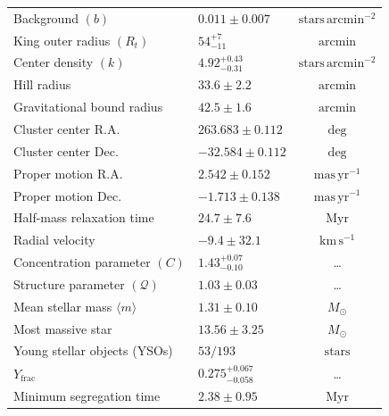 \documentclass{aa}
\begin{document}
\begin{table}[!tbp]
{\begin{tabular}{llc}
			Background $(b)$                        & $0.011 \pm 0.007$  & $\mathrm{stars\,arcmin^{-2}}$      \\
			King outer radius $(R_t)$               & $54^{+7}_{-11}$ & $\mathrm{arcmin}$                  \\
			Center density $(k)$                    & $4.92^{+0.43}_{-0.31}$   & $\mathrm{stars\,arcmin^{-2}}$      \\
			Hill radius                             & $33.6 \pm 2.2$            & $\mathrm{arcmin}$                  \\
			Gravitational bound radius              & $42.5 \pm 1.6$            & $\mathrm{arcmin}$                  \\
			Cluster center R.A.                     & $263.683 \pm 0.112$ & $\mathrm{deg}$                     \\
			Cluster center Dec.                     & $-32.584 \pm 0.112$ & $\mathrm{deg}$                     \\
			Proper motion R.A.                      & $2.542 \pm 0.152$  & $\mathrm{mas\,yr^{-1}}$            \\
			Proper motion Dec.                      & $-1.713 \pm 0.138$ & $\mathrm{mas\,yr^{-1}}$            \\
			Half-mass relaxation time               & $24.7 \pm 7.6$             & $\mathrm{Myr}$                     \\
			Radial velocity                         & $-9.4 \pm 32.1$  & $\mathrm{km\,s^{-1}}$              \\
			Concentration parameter $(C)$           & $1.43^{+0.07}_{-0.10}$    & \ldots                             \\
			Structure parameter $(\mathcal{Q})$     & $1.03 \pm 0.03$    & \ldots                             \\
			Mean stellar mass $\langle m \rangle$   & $1.31 \pm 0.10$    & $M_\odot$                          \\
			Most massive star                       & $13.56 \pm 3.25$   & $M_\odot$                          \\
			Young stellar objects (YSOs)            & $53/193$            & $\mathrm{stars}$                   \\
			$Y_{\text{frac}}$                       & $0.275^{+0.067}_{-0.058}$          & \ldots                             \\
			Minimum segregation time                & $2.38 \pm 0.95$             & $\mathrm{Myr}$                     \\ \hline

\end{tabular}}
\end{table}
\end{document}
